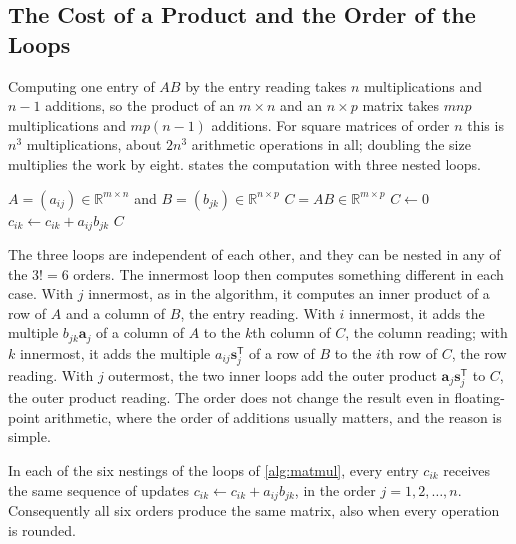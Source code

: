 \subsection{The Cost of a Product and the Order of the Loops}

Computing one entry of $AB$ by the entry reading takes $n$ multiplications and $n-1$ additions, so the product of an $m\times n$ and an $n\times p$ matrix takes $mnp$ multiplications and $mp(n-1)$ additions. For square matrices of order $n$ this is $n^3$ multiplications, about $2n^3$ arithmetic operations in all; doubling the size multiplies the work by eight.  states the computation with three nested loops.

\begin{algorithm}
\begin{algorithmic}[1]
\Require $A=(a_{ij})\in\mathbb R^{m\times n}$ and $B=(b_{jk})\in\mathbb R^{n\times p}$
\Ensure $C=AB\in\mathbb R^{m\times p}$
\State $C\gets0$ 
      \State $c_{ik}\gets c_{ik}+a_{ij}b_{jk}$
    \EndFor
  \EndFor
\EndFor
\State \Return $C$
\end{algorithmic}
\caption{The matrix product by three nested loops, in the order $i,k,j$. The three \textbf{for} lines may be arranged in any of the six possible orders without changing the result (\cref{prop:loop-orders}). The cost is $mnp$ multiplications and as many additions.}
\label{alg:matmul}
\end{algorithm}

The three loops are independent of each other, and they can be nested in any of the $3!=6$ orders. The innermost loop then computes something different in each case. With $j$ innermost, as in the algorithm, it computes an inner product of a row of $A$ and a column of $B$, the entry reading. With $i$ innermost, it adds the multiple $b_{jk}\mathbf a_j$ of a column of $A$ to the $k$th column of $C$, the column reading; with $k$ innermost, it adds the multiple $a_{ij}\mathbf s_j^{\mathsf T}$ of a row of $B$ to the $i$th row of $C$, the row reading. With $j$ outermost, the two inner loops add the outer product $\mathbf a_j\mathbf s_j^{\mathsf T}$ to $C$, the outer product reading. The order does not change the result even in floating-point arithmetic, where the order of additions usually matters, and the reason is simple.

\begin{proposition}
\label{prop:loop-orders}
In each of the six nestings of the loops of \cref{alg:matmul}, every entry $c_{ik}$ receives the same sequence of updates $c_{ik}\gets c_{ik}+a_{ij}b_{jk}$, in the order $j=1,2,\ldots,n$. Consequently all six orders produce the same matrix, also when every operation is rounded.
\end{proposition}

